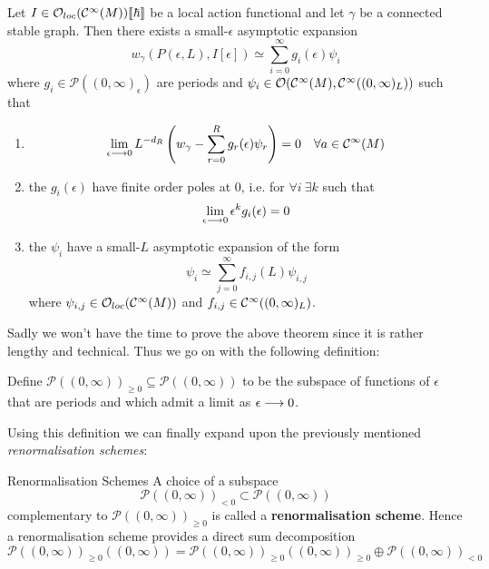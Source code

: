 \begin{theo}
  Let $I \in \mathcal{O}_{loc}(\mathcal{C}^{\infty}(M))\llbracket \hbar \rrbracket$ be a local action functional and let $\gamma$ be a connected stable graph. Then there exists a small-$\epsilon$ asymptotic expansion
  $$ w_\gamma (P(\epsilon,L), I[\epsilon]) \simeq \sum_{i=0}^{\infty} g_i(\epsilon) \psi_i $$
  where $g_i \in \mathcal{P}((0,\infty)_\epsilon)$ are periods and $\psi_i \in \mathcal{O}(\mathcal{C}^{\infty}(M), \mathcal{C}^{\infty}((0,\infty)_L))$ such that
  \begin{enumerate}
    \item $$ \lim_{\epsilon\lra 0} L^{-d_R} \left(w_\gamma - \sum_{r=0}^R g_r(\epsilon) \psi_r \right) = 0 \quad \forall a \in \Ci(M) $$

    \item the $g_i(\epsilon)$ have finite order poles at $0$, i.e. for $\forall i \ \exists k$ such that
    $$ \lim_{\epsilon\lra 0} \epsilon^k g_i(\epsilon) = 0 $$

    \item the $\psi_i$ have a small-$L$ asymptotic expansion of the form
    $$ \psi_i \simeq \sum_{j=0}^{\infty} f_{i,j} (L) \psi_{i,j} $$
    where $\psi_{i,j} \in \mathcal{O}_{loc}(\mathcal{C}^{\infty}(M))$ and $f_{i,j} \in \mathcal{C}^{\infty}((0,\infty)_L)$.
  \end{enumerate}
\end{theo}

Sadly we won't have the time to prove the above theorem since it is rather lengthy and technical. Thus we go on with the following definition:

\begin{definition}
  Define $\mathcal{P}((0,\infty))_{\geq 0} \subseteq \mathcal{P}((0,\infty))$ to be the subspace of functions of $\epsilon$ that are periods and which admit a limit as $\epsilon \lra 0$.
\end{definition}

Using this definition we can finally expand upon the previously mentioned \emph{renormalisation schemes}:

\begin{definition}{Renormalisation Schemes}
  A choice of a subspace
  $$ \mathcal{P}((0,\infty))_{< 0} \subset \mathcal{P}((0,\infty))  $$
  complementary to $\mathcal{P}((0,\infty))_{\geq 0}$ is called a \textbf{renormalisation scheme}. Hence a renormalisation scheme provides a direct sum decomposition
  $$ \mathcal{P}((0,\infty))_{\geq 0}((0,\infty)) = \mathcal{P}((0,\infty))_{\geq 0}((0,\infty))_{\geq 0} \oplus \mathcal{P}((0,\infty))_{< 0} $$
\end{definition}

